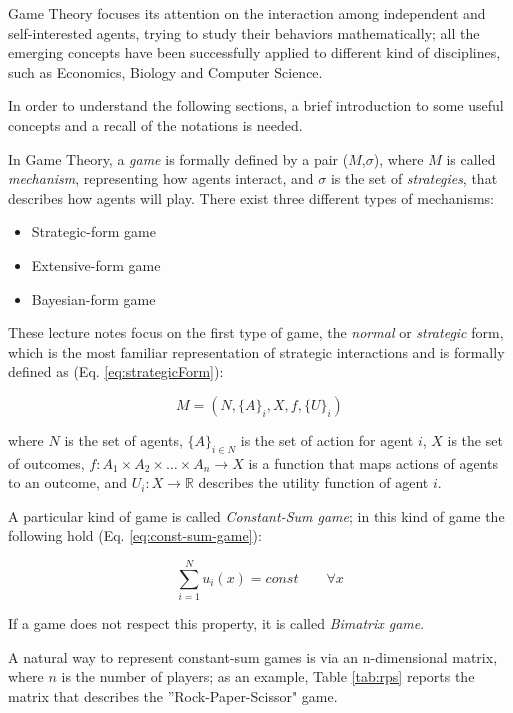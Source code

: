 \begin{Topic}[Introduction]
Game Theory focuses its attention on the interaction among independent and self-interested agents, trying to study their behaviors mathematically; all the emerging concepts have been successfully applied to different kind of disciplines, such as Economics, Biology and Computer Science.

In order to understand the following sections, a brief introduction to some useful concepts and a recall of the notations is needed.

In Game Theory, a \emph{game} is formally defined by a pair ($M$,$\sigma$), where $M$ is called \emph{mechanism}, representing how agents interact, and $\sigma$ is the set of \emph{strategies}, that describes how agents will play. There exist three different types of mechanisms:
\begin{itemize}
\item Strategic-form game
\item Extensive-form game
\item Bayesian-form game
\end{itemize}

These lecture notes focus on the first type of game, the \emph{normal} or \emph{strategic} form, which is the most familiar representation of strategic interactions and is formally defined as (Eq. \ref{eq:strategicForm}):

\begin{equation}
M = (N, \{A\}_i, X, f, \{U\}_i)
\label{eq:strategicForm}
\end{equation}

where $N$ is the set of agents, $\{A\}_{i \in N}$ is the set of action for agent $i$, $X$ is the set of outcomes, $f: A_1 \times A_2 \times \dots \times A_n \rightarrow X$ is a function that maps actions of agents to an outcome, and $U_i: X \rightarrow \mathbb{R}$ describes the utility function of agent $i$.

A particular kind of game is called \emph{Constant-Sum game}; in this kind of game the following hold (Eq. \ref{eq:const-sum-game}):

\begin{equation}
\sum \limits_{i=1}^N u_i(x) = const \qquad \forall x
\label{eq:const-sum-game}
\end{equation}

If a game does not respect this property, it is called \emph{Bimatrix game}.

A natural way to represent constant-sum games is via an n-dimensional matrix, where $n$ is the number of players; as an example, Table \ref{tab:rps} reports the matrix that describes the ''Rock-Paper-Scissor" game.


\end{Topic}
